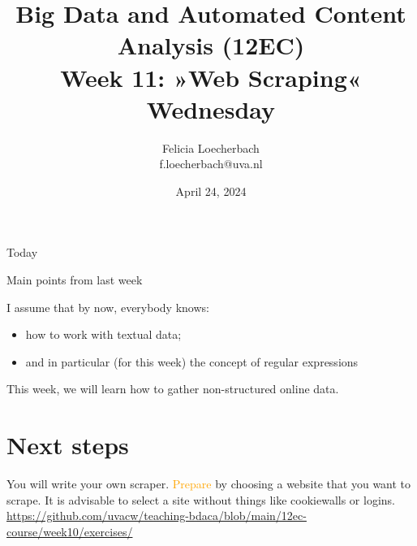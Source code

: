 \documentclass[compress]{beamer}
\begin{document}
\title[Big Data and Automated Content Analysis]{\textbf{Big Data and Automated Content Analysis (12EC)} 
\\Week 11: »Web Scraping«
\\Wednesday}
\author[Felicia Loecherbach]{Felicia Loecherbach\\ \footnotesize{f.loecherbach@uva.nl \\}}
\date{April 24, 2024}


\begin{frame}{}
	\titlepage
\end{frame}

\begin{frame}{Today}
	\tableofcontents
\end{frame}





\begin{frame}{Main points from last week}

\begin{alertblock}{I assume that by now, everybody knows:}
\begin{itemize}
\item how to work with textual data;
\item and in particular (for this week) the concept of regular expressions
\end{itemize}
\end{alertblock}
\end{frame}


\begin{frame}[standout]
This week, we will learn how to gather non-structured online data.
\end{frame}






\section{Next steps}

\begin{frame}[standout]
You will write your own scraper. \textcolor{orange}{Prepare} by choosing a website that you want to scrape. It is advisable to select a site without things like cookiewalls or logins.
\large{\url{https://github.com/uvacw/teaching-bdaca/blob/main/12ec-course/week10/exercises/}}
\end{frame}





\begin{frame}
	\printbibliography
\end{frame}
\end{document}
